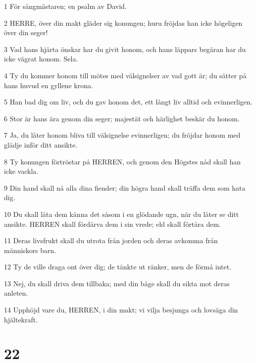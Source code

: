 \par 1 För sångmästaren; en psalm av David.
\par 2 HERRE, över din makt gläder sig konungen; huru fröjdas han icke högeligen över din seger!
\par 3 Vad hans hjärta önskar har du givit honom, och hans läppars begäran har du icke vägrat honom. Sela.
\par 4 Ty du kommer honom till mötes med välsignelser av vad gott är; du sätter på hans huvud en gyllene krona.
\par 5 Han bad dig om liv, och du gav honom det, ett långt liv alltid och evinnerligen.
\par 6 Stor är hans ära genom din seger; majestät och härlighet beskär du honom.
\par 7 Ja, du låter honom bliva till välsignelse evinnerligen; du fröjdar honom med glädje inför ditt ansikte.
\par 8 Ty konungen förtröstar på HERREN, och genom den Högstes nåd skall han icke vackla.
\par 9 Din hand skall nå alla dina fiender; din högra hand skall träffa dem som hata dig.
\par 10 Du skall låta dem känna det såsom i en glödande ugn, när du låter se ditt ansikte. HERREN skall fördärva dem i sin vrede; eld skall förtära dem.
\par 11 Deras livsfrukt skall du utrota från jorden och deras avkomma från människors barn.
\par 12 Ty de ville draga ont över dig; de tänkte ut ränker, men de förmå intet.
\par 13 Nej, du skall driva dem tillbaka; med din båge skall du sikta mot deras anleten.
\par 14 Upphöjd vare du, HERREN, i din makt; vi vilja besjunga och lovsäga din hjältekraft.

\chapter{22}

